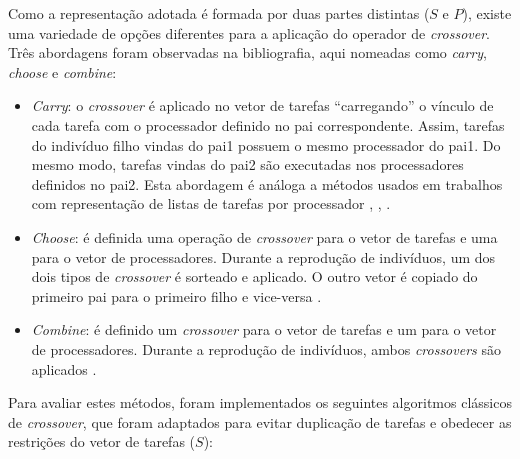 \documentclass[fleqn,10pt]{SelfArx} %
\begin{document}
Como a representação adotada é formada por duas partes distintas (\(S\) e \(P\)), existe uma variedade de opções diferentes para a aplicação do operador de \textit{crossover}. Três abordagens foram observadas na bibliografia, aqui nomeadas como \textit{carry}, \textit{choose} e \textit{combine}:

\begin{itemize}
\item{\textit{Carry}}: o \textit{crossover} é aplicado no vetor de tarefas ``carregando'' o vínculo de cada tarefa com o processador definido no pai correspondente. Assim, tarefas do indivíduo filho vindas do pai1 possuem o mesmo processador do pai1. Do mesmo modo, tarefas vindas do pai2 são executadas nos processadores definidos no pai2. Esta abordagem é análoga a métodos usados em trabalhos com representação de listas de tarefas por processador \cite{Hou1994}, \cite{Correa}, \cite{Kaur_heuristicsbased}.

\item{\textit{Choose}}: é definida uma operação de \textit{crossover} para o vetor de tarefas e uma para o vetor de processadores. Durante a reprodução de indivíduos, um dos dois tipos de \textit{crossover} é sorteado e aplicado. O outro vetor é copiado do primeiro pai para o primeiro filho e vice-versa \cite{OMARA201013}.

\item{\textit{Combine}}: é definido um \textit{crossover} para o vetor de tarefas e um para o vetor de processadores. Durante a reprodução de indivíduos, ambos \textit{crossovers} são aplicados \cite{Morady}.
\end{itemize}

Para avaliar estes métodos, foram implementados os seguintes algoritmos clássicos de \textit{crossover}, que foram adaptados para evitar duplicação de tarefas e obedecer as restrições do vetor de tarefas ($S$):
\end{document}
